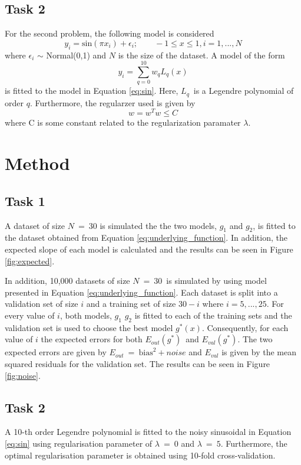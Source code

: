 \documentclass[a4paper,10pt]{article}
\begin{document}
\subsection{Task 2}
For the second problem, the following model is considered
\begin{equation}
  y_i = \text{sin}(\pi x_i) + \epsilon_i;\qquad -1 \leq x \leq1, i=1,...,N
  \label{eq:sin}
\end{equation}
where $\epsilon_i$ $\sim$ Normal(0,1) and $N$ is the
size of the dataset. A model of the form
\begin{equation}
 y_i = \sum_{q=0}^{10} w_q L_q(x)
\end{equation}
is fitted to the model in Equation {\ref{eq:sin}}. Here, $L_q$ is a Legendre
polynomial of order $q$. Furthermore, the regularzer used is given by
\begin{equation}
  w = w^T w \leq C
\end{equation}
where C is some constant related to the regularization paramater $\lambda$.

\section{Method}
\subsection{Task 1}
A dataset of size $N\ = \ 30$ is simulated the the two models, $g_1$ and $g_2$, is fitted to
the dataset obtained from Equation {\ref{eq:underlying_function}}. In addition,
the expected slope of each model is calculated and the results can be seen in
Figure {\ref{fig:expected}}. \newline

In addition, 10,000 datasets of size $N\ =\ 30$ is simulated
by using model presented in Equation {\ref{eq:underlying_function}}. Each
dataset is split into a validation set of size $i$ and a training
set of size $30-i$ where $i = 5,...,25$. For every value of $i$, both models, $g_1$
$g_2$ is fitted to each of the training sets and the validation set is used
to choose the best model $g^*(x)$. Consequently, for each value of $i$
the expected errors for both $E_{out}(g^*)$ and $E_{val}(g^*)$. The two
expected errors are given by $E_{out}\ =\ \text{bias}^2 + noise$ and
$E_{val}$ is given by the mean squared residuals for the validation set. The results
can be seen in Figure {\ref{fig:noise}}.

\subsection{Task 2}
A 10-th order Legendre polynomial is fitted to the noisy sinusoidal in
Equation {\ref{eq:sin}} using regularisation parameter of
$\lambda\ =\ 0$ and $\lambda\ =\ 5$. Furthermore, the optimal
regularisation parameter is obtained using 10-fold cross-validation.
\end{document}
